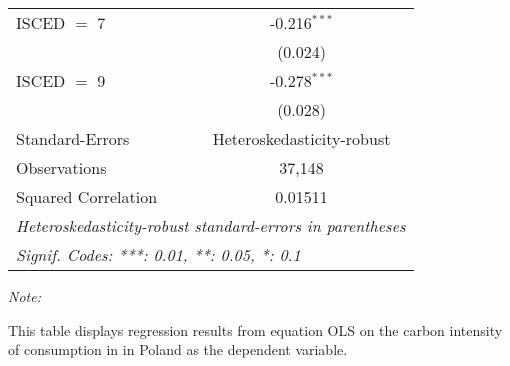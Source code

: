 \begin{table}[htbp!]
\begin{adjustbox}{width = 1\textwidth, max height = 0.95\textheight, center}
\begin{threeparttable}[b]
\begin{tabular}{lc}
            ISCED $=$ 7         & -0.216$^{***}$\\   
                                & (0.024)\\   
            ISCED $=$ 9         & -0.278$^{***}$\\   
                                & (0.028)\\   
            \midrule 
            Standard-Errors     & Heteroskedasticity-robust \\   
            Observations        & 37,148\\  
            Squared Correlation & 0.01511\\  
            \midrule \midrule
            \multicolumn{2}{l}{\emph{Heteroskedasticity-robust standard-errors in parentheses}}\\
            \multicolumn{2}{l}{\emph{Signif. Codes: ***: 0.01, **: 0.05, *: 0.1}}\\
         \end{tabular}
         
         \begin{tablenotes}\item \medskip \textit{Note:}
            \item This table displays regression results from equation OLS on the carbon intensity of consumption in  in Poland as the dependent variable. 
         \end{tablenotes}
      \end{threeparttable}
   \end{adjustbox}
\end{table}


